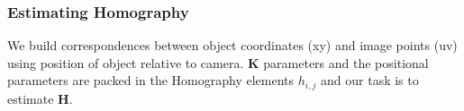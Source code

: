 \documentclass[titlepage]{article}
\begin{document}
\subsubsection{Estimating Homography}
We build correspondences between object coordinates (xy) and image points (uv) using position of object relative to camera. \textbf{K} parameters and the positional parameters are packed in the Homography elements $h_{i,j}$ and our task is to estimate \textbf{H}.
%
\end{document}
